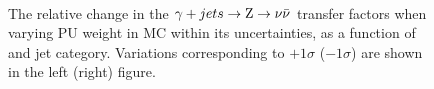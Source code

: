 \begin{figure}[]
  \centering
   ~~
  \\

  \caption{\label{fig:tfSyst_pu_gjToZinv} The relative change in the $\gj \rightarrow \znunu$ transfer
  factors when varying PU weight in MC within its uncertainties, as a function of \scalht and jet category. 
  Variations corresponding to $+1\sigma$ ($-1\sigma$) are shown in the left (right) figure. 
  }
\end{figure}

